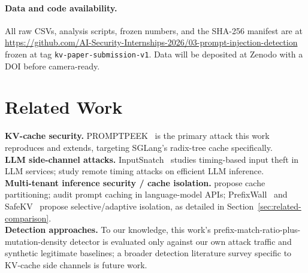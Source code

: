 \documentclass[11pt]{article}
\begin{document}
\paragraph{Data and code availability.} All raw CSVs, analysis
scripts, frozen numbers, and the SHA-256 manifest are at
\url{https://github.com/AI-Security-Internships-2026/03-prompt-injection-detection}
frozen at tag \texttt{kv-paper-submission-v1}. Data will be
deposited at Zenodo with a DOI before camera-ready.

\section{Related Work}
\label{sec:related}
\textbf{KV-cache security.} PROMPTPEEK~\citep{wu2025promptpeek} is the
primary attack this work reproduces and extends, targeting SGLang's
radix-tree cache specifically.\\
\textbf{LLM side-channel attacks.} InputSnatch~\citep{zheng2024inputsnatch}
studies timing-based input theft in LLM services;
\citet{carlini2024remote} study remote timing attacks on efficient LLM
inference.\\
\textbf{Multi-tenant inference security / cache isolation.}
\citet{pang2024partitioning} propose cache partitioning;
\citet{gu2025auditing} audit prompt caching in language-model APIs;
PrefixWall~\citep{pennas2026prefixwall} and
SafeKV~\citep{chu2025safekv} propose selective/adaptive isolation, as
detailed in Section~\ref{sec:related-comparison}.\\
\textbf{Detection approaches.} To our knowledge, this work's
prefix-match-ratio-plus-mutation-density detector is evaluated only
against our own attack traffic and synthetic legitimate baselines; a
broader detection literature survey specific to KV-cache side channels
is future work.

\clearpage
\appendix
\end{document}
